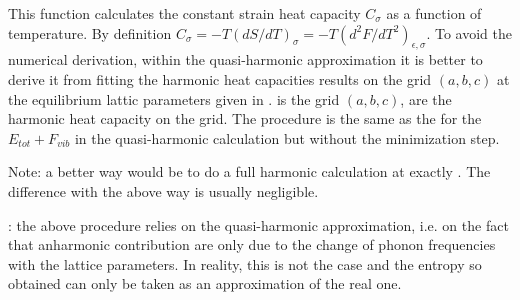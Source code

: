 \documentclass[letterpaper,10pt,english]{sphinxmanual}
\begin{document}
\begin{fulllineitems}
\label{pyqha:pyqha.properties_anis.compute_Csigma}
This function calculates the constant strain heat capacity \(C_{\sigma}\)
as a function of temperature. 
By definition \(C_{\sigma} = -T(dS/dT)_{\sigma}=-T(d^2F/dT^2)_{\epsilon,\sigma}\). 
To avoid the numerical derivation, within the quasi-harmonic
approximation it is better to derive it from fitting the harmonic heat capacities
results on the grid \((a,b,c)\) at the equilibrium lattic parameters given
in .  is the grid \((a,b,c)\),  are the harmonic 
heat capacity on the grid.
The procedure is the same as the for the \(E_{tot}+F_{vib}\) in the quasi-harmonic
calculation but without the minimization step.

Note: a better way would be to do a full harmonic calculation at exactly .
The difference with the above way is usually negligible.

: the above procedure relies on the quasi-harmonic approximation,
i.e. on the fact that anharmonic contribution are only due to the change of
phonon frequencies with the lattice parameters. In reality, this is not the 
case and the entropy so obtained can only be taken as an approximation of the
real one.

\end{fulllineitems}

\end{document}
